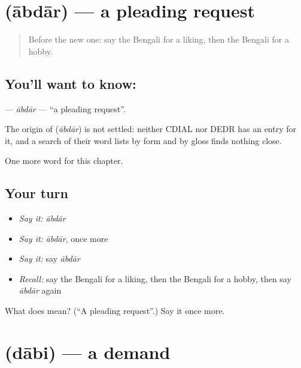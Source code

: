 \section[\texorpdfstring{\bn{আবদার} (ābdār)}{আবদার (ābdār)}]{ (ābdār) — a pleading request}

\label{lesson:BN-C97-abdar}



\begin{quote}
Before the new one: say the Bengali for a liking, then the Bengali for a hobby.
\end{quote}

\subsection*{You'll want to know: }
\textbf{} — \emph{ābdār} — \textquotedblleft{}a pleading request\textquotedblright{}.

\begin{cousinweb}
The origin of \textbf{} (\emph{ābdār}) is not settled: neither CDIAL nor DEDR has an entry for it, and a search of their word lists by form and by gloss finds nothing close.
\end{cousinweb}

\begin{grammarlens}[title={What you've built}]
One more word for this chapter.
\end{grammarlens}

\subsection*{Your turn}
\begin{itemize}
\raggedright
  \item \emph{Say it:} \emph{ābdār}
  \item \emph{Say it:} \emph{ābdār}, once more
  \item \emph{Say it:} say \emph{ābdār}
  \item \emph{Recall:} say the Bengali for a liking, then the Bengali for a hobby, then say \emph{ābdār} again
\end{itemize}

\begin{tcolorbox}[breakable,colback=teal!4,colframe=teal!35!black,title={Before you move on}]
What does  mean? (\textquotedblleft{}A pleading request\textquotedblright{}.) Say it once more.
\end{tcolorbox}
\section[\texorpdfstring{\bn{দাবি} (dābi)}{দাবি (dābi)}]{ (dābi) — a demand}

